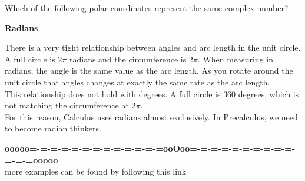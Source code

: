 \documentclass{ximera}
\begin{document}
\begin{question}
Which of the following polar coordinates represent the same complex number?
\begin{selectAll}
\end{selectAll}
\end{question}








\begin{warning} \textbf{\textcolor{red!80!black}{Radians}}


There is a very tight relationship between angles and arc length in the unit circle. \\


A full circle is $2\pi$ radians and the circumference is $2\pi$. When measuring in radians, the angle is the same value as the arc length.  As you rotate around the unit circle that angles changes at exactly the same rate as the arc length. \\

This relationship does not hold with degrees. A full circle is $360$ degrees, which is not matching  the circumference at $2\pi$. \\


For this reason, Calculus uses radians almost exclusively.  In Precalculus, we need to become radian thinkers.





\end{warning}









\begin{center}
\textbf{\textcolor{green!50!black}{ooooo=-=-=-=-=-=-=-=-=-=-=-=-=ooOoo=-=-=-=-=-=-=-=-=-=-=-=-=ooooo}} \\

more examples can be found by following this link\\ 

\end{center}
\end{document}
